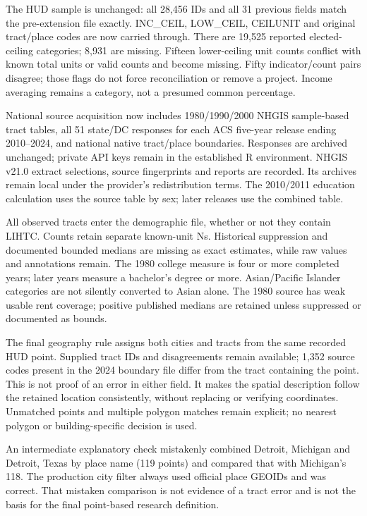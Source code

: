 \documentclass[11pt]{article}
\begin{document}
The HUD sample is unchanged: all 28,456 IDs and all 31 previous fields match the
pre-extension file exactly. INC\_CEIL, LOW\_CEIL, CEILUNIT and original tract/place
codes are now carried through. There are 19,525 reported elected-ceiling categories;
8,931 are missing. Fifteen lower-ceiling unit counts conflict with known total
units or valid counts and become missing. Fifty indicator/count pairs disagree;
those flags do not force reconciliation or remove a project. Income averaging
remains a category, not a presumed common percentage.

National source acquisition now includes 1980/1990/2000 NHGIS sample-based tract
tables, all 51 state/DC responses for each ACS five-year release ending 2010--2024,
and national native tract/place boundaries. Responses are archived unchanged;
private API keys remain in the established R environment. NHGIS v21.0 extract
selections, source fingerprints and reports are recorded. Its archives remain local
under the provider's redistribution terms. The 2010/2011 education calculation
uses the source table by sex; later releases use the combined table.

All observed tracts enter the demographic file, whether or not they contain LIHTC.
Counts retain separate known-unit Ns. Historical suppression and documented bounded
medians are missing as exact estimates, while raw values and annotations remain.
The 1980 college measure is four or more completed years; later years measure a
bachelor's degree or more. Asian/Pacific Islander categories are not silently
converted to Asian alone. The 1980 source has weak usable rent coverage; positive
published medians are retained unless suppressed or documented as bounds.

The final geography rule assigns both cities and tracts from the same recorded
HUD point. Supplied tract IDs and disagreements remain available; 1,352 source
codes present in the 2024 boundary file differ from the tract containing the point.
This is not proof of an error in either field. It makes the spatial description
follow the retained location consistently, without replacing or verifying coordinates.
Unmatched points and multiple polygon matches remain explicit; no nearest polygon
or building-specific decision is used.

An intermediate explanatory check mistakenly combined Detroit, Michigan and
Detroit, Texas by place name (119 points) and compared that with Michigan's 118.
The production city filter always used official place GEOIDs and was correct.
That mistaken comparison is not evidence of a tract error and is not the basis
for the final point-based research definition.
\end{document}
